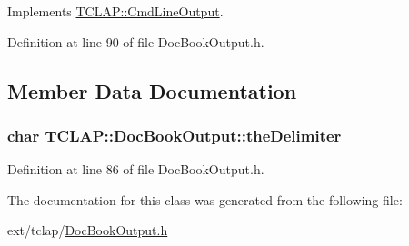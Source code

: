 Implements \hyperlink{class_t_c_l_a_p_1_1_cmd_line_output_ae052fea473132482296de55edb3dd480}{T\+C\+L\+A\+P\+::\+Cmd\+Line\+Output}.



Definition at line 90 of file Doc\+Book\+Output.\+h.



\subsection{Member Data Documentation}
\hypertarget{class_t_c_l_a_p_1_1_doc_book_output_a081a02a93ce13f694d078c79fe42a7c8}{}
\subsubsection[{the\+Delimiter}]{\setlength{\rightskip}{0pt plus 5cm}char T\+C\+L\+A\+P\+::\+Doc\+Book\+Output\+::the\+Delimiter\hspace{0.3cm}{\ttfamily [protected]}}\label{class_t_c_l_a_p_1_1_doc_book_output_a081a02a93ce13f694d078c79fe42a7c8}


Definition at line 86 of file Doc\+Book\+Output.\+h.



The documentation for this class was generated from the following file\+:\begin{DoxyCompactItemize}
\item 
ext/tclap/\hyperlink{_doc_book_output_8h}{Doc\+Book\+Output.\+h}\end{DoxyCompactItemize}
